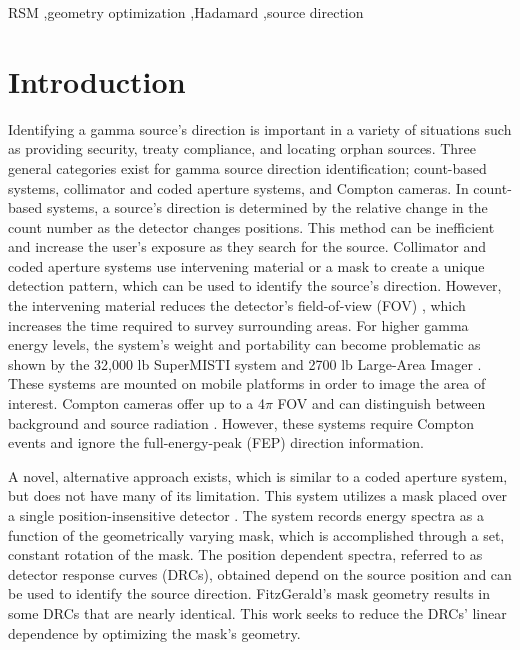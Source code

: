 \documentclass[3p,times]{elsarticle}
\begin{document}
\begin{frontmatter}
\begin{keyword}
RSM \sep geometry optimization \sep Hadamard \sep source direction

\end{keyword}

\end{frontmatter}


\section{Introduction}
\label{intro}
Identifying a gamma source's direction is important in a variety of situations such as providing security, treaty compliance, and locating orphan sources.  
%
Three general categories exist for gamma source direction identification; count-based systems, collimator and coded aperture systems, and Compton cameras.
In count-based systems, a source's direction is determined by the relative change in the count number as the detector changes positions.  This method can 
be inefficient and increase the user's exposure as they search for the source.  Collimator and coded aperture systems 
use intervening material or a mask to create a unique detection pattern, which can be
used to identify the source's direction.  However, the intervening material reduces
the detector's field-of-view (FOV) \cite{Vetter06}, which increases the time required to survey surrounding areas.  For higher gamma energy levels, the system's weight 
and portability can become problematic as shown by the 32,000 lb SuperMISTI system \cite{Hutcheson14} and 2700 lb Large-Area Imager \cite{Ziock06}.  
These systems are mounted on mobile platforms in order to image
the area of interest.  Compton cameras offer up to a 4$\pi$ FOV 
\cite{Wahl11} and can distinguish between background and source radiation \cite{Vetter06, Phillips95}.  However,
these systems require Compton events and ignore the full-energy-peak (FEP) 
direction information.

A novel, alternative approach exists, which is similar to a coded aperture system, but does not have many of its limitation.
This system utilizes a mask placed over a single position-insensitive detector \cite{FitzGerald2015}.  
The system records energy spectra as a function of the geometrically varying mask, which is accomplished through a set, constant rotation of the mask. 
The position dependent spectra, referred to as detector response curves (DRCs), obtained depend on the source position and can be used to identify the source direction.  FitzGerald's mask geometry results in some DRCs that are nearly identical.  This work seeks to reduce the DRCs' linear dependence 
by optimizing the mask's geometry.
\end{document}
